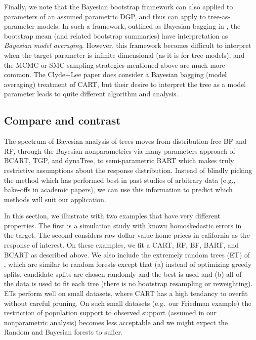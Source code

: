 \documentclass{article}
\begin{document}
Finally, we note that the Bayesian bootstrap framework can also applied
to parameters of an assumed parametric DGP, and thus can apply to
tree-as-parameter models. In such a framework, outlined as Bayesian
bagging in \cite{clyde_bagging_2001}, the bootstrap mean (and related
bootstrap summaries) have interpretation as \emph{Bayesian model
averaging}. However, this framework becomes difficult to interpret when
the target parameter is infinite dimensional (as it is for tree models),
and the MCMC or SMC sampling strategies mentioned above are much more
common. The Clyde+Lee paper does consider a Bayesian bagging (model
averaging) treatment of CART, but their desire to interpret the tree as
a model parameter leads to quite different algorithm and analysis.

    \subsection{Compare and contrast}\label{compare-and-contrast}

The spectrum of Bayesian analysis of trees moves from distribution free
BF and RF, through the Bayesian nonparametrics-via-many-parameters
approach of BCART, TGP, and dynaTree, to semi-parametric BART which
makes truly restrictive assumptions about the response distribution.
Instead of blindly picking the method which has performed best in past
studies of arbitrary data (e.g., bake-offs in academic papers), we can
use this information to predict which methods will suit our application.

In this section, we illustrate with two examples that have very
different properties. The first is a simulation study with known
homoskedastic errors in the target. The second considers raw
dollar-value home prices in california as the response of interest. On
these examples, we fit a CART, RF, BF, BART, and BCART as described
above. We also include the extremely random trees (ET) of
\cite{geurts_extremely_2006}, which are similar to random forests except
that (a) instead of optimizing greedy splits, candidate splits are
chosen randomly and the best is used and (b) all of the data is used to
fit each tree (there is no bootstrap resampling or reweighting). ETs
perform well on small datasets, where CART has a high tendancy to
overfit without careful pruning. On such small datasets (e.g.~our
Friedman example) the restriction of population support to observed
support (assumed in our nonparametric analysis) becomes less acceptable
and we might expect the Random and Bayesian forests to suffer.
\end{document}
